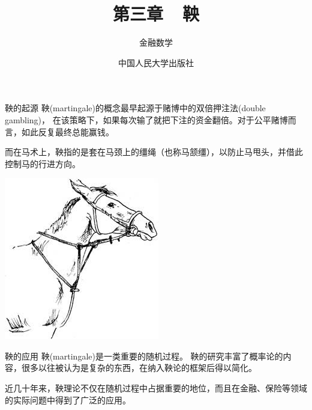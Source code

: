 \documentclass[t]{beamer}
\begin{document}
\fontsize{11}{18}\selectfont


\CTEXindent



  \title{第三章~~鞅}
\author{金融数学}
\date{中国人民大学出版社}
  \begin{frame}
    \maketitle
  \end{frame}

  \begin{frame}{鞅的起源}
    鞅(martingale)的概念最早起源于赌博中的双倍押注法(double gambling)，
    在该策略下，如果每次输了就把下注的资金翻倍。对于公平赌博而言，如此反复最终总能赢钱。
    
    而在马术上，鞅指的是套在马颈上的缰绳（也称马颔缰），以防止马甩头，并借此控制马的行进方向。
    \begin{center}
    \includegraphics[scale=0.7]{fig/martingale.jpg}
    \end{center}
    
    \end{frame}
    
    
    \begin{frame}{鞅的应用}
    鞅(martingale)是一类重要的随机过程。
    鞅的研究丰富了概率论的内容，很多以往被认为是复杂的东西，在纳入鞅论的框架后得以简化。
    
    近几十年来，鞅理论不仅在随机过程中占据重要的地位，而且在金融、保险等领域的实际问题中得到了广泛的应用。
    \end{frame}
    
\end{document}
